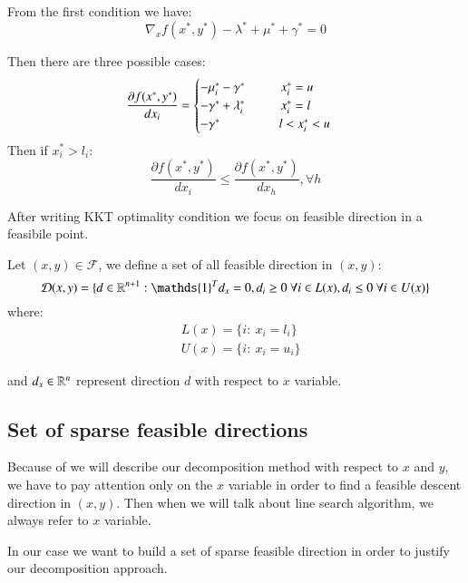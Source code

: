 From the first condition we have:
\begin{equation}
 \nabla_x f(x^*,y^*)-\lambda^*+\mu^*+\gamma^*=0
\end{equation}

Then there are three possible cases:
\begin{equation}
 \frac{\partial f(x^*,y^*)}{dx_i} = \begin{cases} -\mu_i^* -\gamma^* \hspace{1cm} x^*_i =u \\
 -\gamma^*+\lambda^*_i \hspace{1cm} x^*_i =l \\
 -\gamma^* \hspace{1.65cm} l<x^*_i <u 
\end{cases}
\end{equation}
Then if $x^*_i>l_i$: 
\begin{equation}
 \frac{\partial f(x^*,y^*)}{dx_i} \le \frac{\partial f(x^*,y^*)}{dx_h}, \forall h
\end{equation}

After writing KKT optimality condition we focus on feasible direction in a feasibile point.

Let $(x,y) \in \mathcal{F}$, we define a set of all feasible direction in $(x,y)$:
\begin{equation}
 \mathcal{D}(x,y)=\{ d \in \R^{n+1}: \mathds{1}^Td_x=0, d_i\ge 0 \ \forall i \in L(x), d_i\le 0 \ \forall i \in U(x)\}
\end{equation}
where:
\begin{equation}
 \begin{aligned}
  &L(x)=\{ i: \ x_i=l_i\}\\
  &U(x)=\{ i: \ x_i=u_i\}
 \end{aligned}
\end{equation}

and $d_x \in \mathbb{R}^n$ represent direction $d$ with respect to $x$ variable.

\subsection{Set of sparse feasible directions}
Because of we will describe our decomposition method with respect to $x$ and $y$, we have to pay attention only on the $x$ variable in order to find a feasible descent direction in $(x,y)$.
Then when we will talk about line search algorithm, we always refer to $x$ variable.

In our case we want to build a set of sparse feasible direction in order to justify our decomposition approach.

